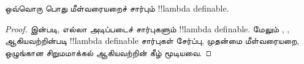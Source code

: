 \documentclass[../../../include/open-logic-section]{subfiles}
\begin{document}
\begin{prop}
  ஒவ்வொரு பொது மீள்வரையறைச் சார்பும் !!{lambda definable}.
\end{prop}

\begin{proof}
  இன்படி, எல்லா அடிப்படைச் சார்புகளும்
 !!{lambda definable}. மேலும் ,
 ,  ஆகியவற்றின்படி
 !!{lambda definable} சார்புகள் சேர்ப்பு, முதன்மை மீள்வரையறை,
 ஒழுங்கான சிறுமமாக்கல் ஆகியவற்றின் கீழ் மூடியவை.
\end{proof}
\end{document}
